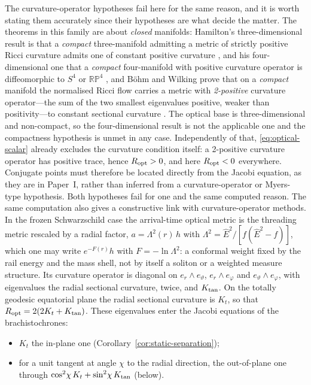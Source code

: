 \documentclass[12pt]{iopart}
\theoremstyle{plain}
\theoremstyle{definition}
\theoremstyle{remark}
\newcommand{\Ehat}{\hat E}
\begin{document}
The curvature-operator hypotheses fail here for the same reason, and it is worth
stating them accurately since their hypotheses are what decide the matter. The
theorems in this family are about \emph{closed} manifolds: Hamilton's
three-dimensional result is that a \emph{compact} three-manifold admitting a metric
of strictly positive Ricci curvature admits one of constant positive curvature
\cite[Thm.~1.1]{Hamilton1982}, and his four-dimensional one that a \emph{compact}
four-manifold with positive curvature operator is diffeomorphic to $S^4$ or
$\mathbb{RP}^4$ \cite[Thm.~1.1]{Hamilton1986}, and B\"ohm and Wilking prove
that on a \emph{compact} manifold the normalised Ricci flow carries a metric with
\emph{2-positive} curvature operator---the sum of the two smallest eigenvalues
positive, weaker than positivity---to constant sectional curvature
\cite[Thm.~1]{BoehmWilking2008}. The optical base is three-dimensional and
non-compact, so the four-dimensional result is not the applicable one and the
compactness hypothesis is unmet in any case. Independently of that,
\eqref{eq:optical-scalar} already excludes the curvature condition itself: a
2-positive curvature operator has positive trace, hence $R_{\rm opt}>0$, and here
$R_{\rm opt}<0$ everywhere. Conjugate points must therefore be located directly
from the Jacobi equation, as they are in Paper~I, rather than inferred from a
curvature-operator or Myers-type hypothesis. Both hypotheses fail for one and the
same computed reason. The same computation also gives a constructive link with curvature-operator
methods. In the frozen Schwarzschild case the arrival-time optical metric is the threading
metric rescaled by a radial factor, $a=\Lambda^2(r)\,h$ with
$\Lambda^2=\Ehat^2/[f(\Ehat^2-f)]$, which one may write $e^{-F(r)}h$ with $F=-\ln\Lambda^2$:
a conformal weight fixed by the rail energy and the mass shell, not by itself a soliton or
a weighted measure structure. Its curvature operator is diagonal on
$e_r\wedge e_\vartheta$, $e_r\wedge e_\varphi$ and $e_\vartheta\wedge e_\varphi$, with
eigenvalues the radial sectional curvature, twice, and $K_{\rm tan}$. On the totally
geodesic equatorial plane the radial sectional curvature is $K_t$, so that
$R_{\rm opt}=2(2K_t+K_{\rm tan})$. These eigenvalues enter the Jacobi equations of the
brachistochrones:
\begin{itemize}
\item $K_t$ the in-plane one (Corollary~\ref{cor:static-separation});
\item for a unit tangent at angle $\chi$ to the radial direction, the out-of-plane one
through $\cos^2\!\chi\,K_t+\sin^2\!\chi\,K_{\rm tan}$ (below).
\end{itemize}
\end{document}
